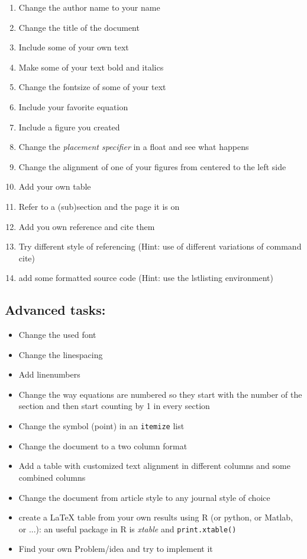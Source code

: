 \documentclass{article}
\numberwithin{equation}{section}
\begin{document}
\begin{enumerate}
	\item Change the author name to your name
	\item Change the title of the document
    \item Include some of your own text
    \item Make some of your text bold and italics
    \item Change the fontsize of some of your text
    \item Include your favorite equation
    \item Include a figure you created
    \item Change the \textit{placement specifier} in a float and see what happens
    \item Change the alignment of one of your figures from centered to the left side
    \item Add your own table
    \item Refer to a (sub)section and the page it is on
    \item Add you own reference and cite them
    \item Try different style of referencing (Hint: use of different variations of command cite)
    \item add some formatted source code (Hint: use the lstlisting environment)
\end{enumerate}

\subsection{Advanced tasks:}

\begin{itemize}
    \item Change the used font
    \item Change the linespacing
    \item Add linenumbers
    \item Change the way equations are numbered so they start with the number of the section and then start counting by 1 in every section
    \item Change the symbol (point) in an \texttt{itemize} list
	\item Change the document to a two column format
    \item Add a table with customized text alignment in different columns and some combined columns
    \item Change the document from article style to any journal style of choice
    \item create a \LaTeX{} table from your own results using R (or python, or Matlab, or ...): an useful package in R is \textit{xtable} and \texttt{print.xtable()}
    \item Find your own Problem/idea and try to implement it

\end{itemize}
\end{document}
